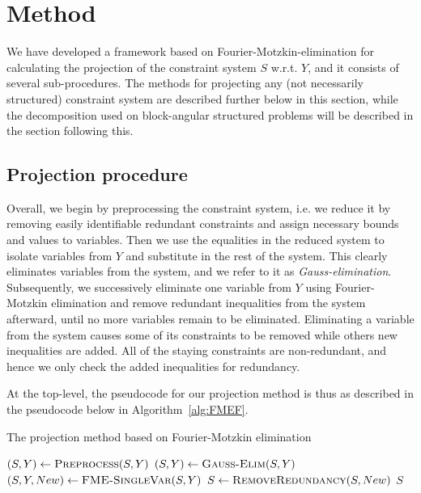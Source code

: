 %
%
\section{Method}\label{sec:methods}
We have developed a framework based on Fourier-Motzkin-elimination for calculating the projection of the constraint system $S$ w.r.t. $Y$, and it %
consists of several sub-procedures. The methods for projecting any (not necessarily structured) constraint system are described further below in this section, while the decomposition used on block-angular structured problems will be described in the section following this.

\subsection{Projection procedure}
Overall, we begin by preprocessing the constraint system, i.e. we reduce it by removing easily identifiable redundant constraints and assign necessary bounds and values to variables.
Then we use the equalities in the reduced system to isolate variables from $Y$ and substitute in the rest of the system. This clearly eliminates variables from the system, and we refer to it as \emph{Gauss-elimination}.  
Subsequently, we successively eliminate one variable from $Y$ using Fourier-Motzkin elimination and remove redundant inequalities from the system afterward, until no more variables remain to be eliminated. Eliminating a variable from the system causes some of its constraints to be removed while others new inequalities are added. All of the {staying} constraints are non-redundant, and hence we only check the added inequalities for redundancy. 

At the top-level, the pseudocode for our projection method is thus as described in the pseudocode below in Algorithm~\ref{alg:FMEF}. 

\begin{algorithm}
\caption{The projection method based on Fourier-Motzkin elimination} 
\label{alg:FMEF}
\begin{algorithmic}
	\State $(S,Y)\gets \Call{Preprocess}{S,Y}$
	\State $(S,Y)\gets\Call{Gauss-Elim}{S,Y}$
		\State $(S, Y, New )\gets\Call{FME-SingleVar}{S,Y}$
		\State $S\gets\Call{RemoveRedundancy}{S,New}$
	\EndWhile
	\State \Return $S$
\EndFunction
\end{algorithmic}
\end{algorithm}

